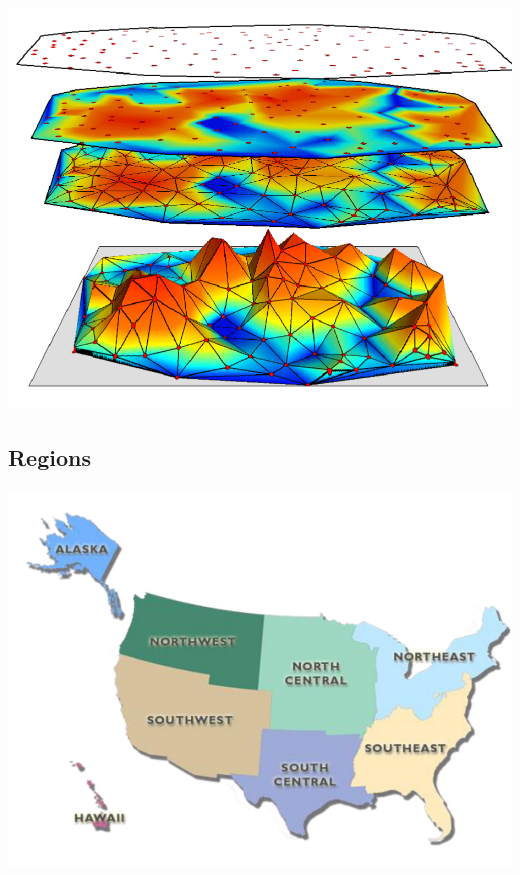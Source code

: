 \documentclass[11pt]{article}
\theoremstyle{definition}
\begin{document}
\includegraphics[width=\textwidth/2]{17.png}

\subsection{Regions}
\includegraphics[width=\textwidth/2]{18.png}
\end{document}
